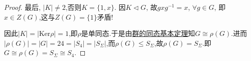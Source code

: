 \documentclass[../../main.tex]{subfiles}%
\begin{document}
\begin{proof}
最后, $|K| \neq 2$,否则$K=\{1,x\}$. 因$K \lhd G$, 故$gxg^{-1}=x$, $\forall g \in G$, 即$x \in Z(G)$,这与$Z(G)=\{1\}$矛盾!

因此$|K|=|\text{Ker}\rho|=1$,即$\rho$是单同态.于是由\hyperref[theorem:群的同态基本定理]{群的同态基本定理}知$G\cong \rho(G)$.进而$|\rho(G)|=|G|=24=|S_4|=|S_\Sigma|$,而$\rho (G)\leqslant S_\Sigma$,故$\rho(G)=S_\Sigma$.即$G\cong \rho(G)=S_\Sigma\cong S_4$.


\end{proof}
\end{document}
